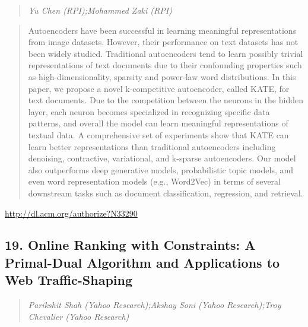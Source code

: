 \documentclass{article}
\begin{document}
\begin{quote}
\footnotesize{\textit{Yu Chen (RPI);Mohammed Zaki (RPI)}}

\end{quote}

\begin{quote}
Autoencoders have been successful in learning meaningful representations from image datasets. However, their performance on text datasets has not been widely studied. Traditional autoencoders tend to learn possibly trivial representations of text documents due to their confounding properties such as high-dimensionality, sparsity and power-law word distributions. In this paper, we propose a novel k-competitive autoencoder, called KATE, for text documents. Due to the competition between the neurons in the hidden layer, each neuron becomes specialized in recognizing specific data patterns, and overall the model can learn meaningful representations of textual data. A comprehensive set of experiments show that KATE can learn better representations than traditional autoencoders including denoising, contractive, variational, and k-sparse autoencoders. Our model also outperforms deep generative models, probabilistic topic models, and even word representation models (e.g., Word2Vec) in terms of several downstream tasks such as document classification, regression, and retrieval.
\end{quote}

\href{http://dl.acm.org/authorize?N33290}{http://dl.acm.org/authorize?N33290}

\subsection{19. Online Ranking with Constraints: A Primal-Dual Algorithm and Applications to Web Traffic-Shaping}

\begin{quote}
\footnotesize{\textit{Parikshit Shah (Yahoo Research);Akshay Soni (Yahoo Research);Troy Chevalier (Yahoo Research)}}

\end{quote}
\end{document}
